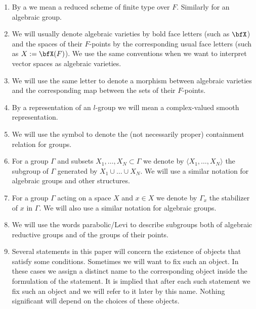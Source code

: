 \documentclass[12pt,a4paper]{amsart}%
\newcommand{\Rami}[1]{{{#1}}}
\newcommand{\EitanD}[1]{{{#1}}}
\begin{document}
\begin{enumerate}
    \item By a  we mean a reduced scheme of finite type over $F$. Similarly for an algebraic group.

    \item We will usually denote algebraic varieties by bold face letters (such as $\bfX$) and the spaces of their $F$-points by the corresponding usual face letters (such as $X:=\bfX(F)$). We use the same conventions when we want to interpret vector spaces as algebraic varieties.

    \item We will use the same letter to denote a morphism between algebraic varieties and the corresponding map between the sets of their $F$-points.
\item By a representation of an $l$-group we will mean a complex-valued smooth representation.
    \item {We will use the symbol \tdef{$<$} to denote the (not necessarily proper) containment relation for groups}.
\item \Rami{For a group $\Gamma$ and subsets $X_1,\dots,X_N\subset \Gamma$ we denote by $\langle X_1,\dots,X_N \rangle$ the subgroup of $\Gamma$ generated by \EitanD{$X_1 \cup \dots \cup X_N$.} We will use a similar notation for algebraic groups and other structures.}
\item \Rami{For a group $\Gamma$ acting on a space $X$ and $x\in X$ we denote by $\Gamma_x$  the stabilizer of $x$ \EitanD{in $\Gamma$}. We will also use a similar notation for algebraic groups.}
\item We will use the words parabolic/Levi to describe subgroups both of algebraic reductive groups and of the groups of their points.

\item 

Several statements in this paper will concern the existence of objects that satisfy some conditions. Sometimes we will want to fix such an object. In these cases 
 we assign a distinct name to the corresponding object inside the formulation of the statement. It is implied that after each such statement we fix such an object and we will refer to it later by this name. Nothing significant will depend on the choices of these objects.


\end{enumerate}
\end{document}
